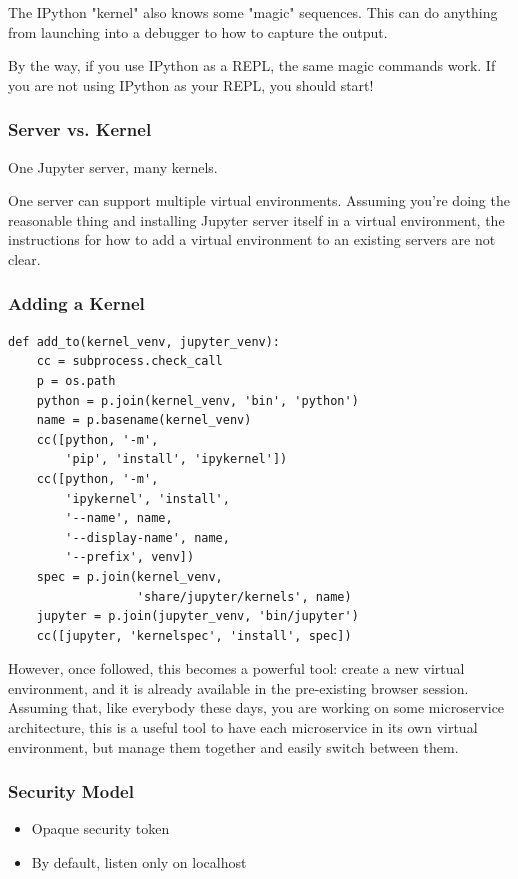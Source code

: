 The IPython "kernel" also knows some "magic" sequences.
This can do anything from launching into a debugger
to how to capture the output.

By the way,
if you use IPython as a REPL,
the same magic commands work.
If you are not using IPython as your REPL,
you should start!

\begin{frame}[fragile]
\frametitle{Server vs. Kernel}

One Jupyter server,
many kernels.

\end{frame} 

One server can support multiple virtual environments.
Assuming you're doing the reasonable thing and installing
Jupyter server itself in a virtual environment,
the instructions for how to add a virtual environment
to an existing servers are not clear.

\begin{frame}[fragile]
\frametitle{Adding a Kernel}

\begin{lstlisting}
def add_to(kernel_venv, jupyter_venv):
    cc = subprocess.check_call
    p = os.path
    python = p.join(kernel_venv, 'bin', 'python')
    name = p.basename(kernel_venv)
    cc([python, '-m',
        'pip', 'install', 'ipykernel'])
    cc([python, '-m',
        'ipykernel', 'install',
        '--name', name,
        '--display-name', name,
        '--prefix', venv])
    spec = p.join(kernel_venv,
                  'share/jupyter/kernels', name)
    jupyter = p.join(jupyter_venv, 'bin/jupyter')
    cc([jupyter, 'kernelspec', 'install', spec])
\end{lstlisting}
\end{frame}


However,
once followed,
this becomes a powerful tool:
create a new virtual environment,
and it is already available in the pre-existing browser session.
Assuming that,
like everybody these days,
you are working on some microservice architecture,
this is a useful tool to have each microservice in its own virtual environment,
but manage them together and easily switch between them.

\begin{frame}
\frametitle{Security Model}

\begin{itemize}
\item Opaque security token
\item By default, listen only on localhost
\end{itemize}

\end{frame}

